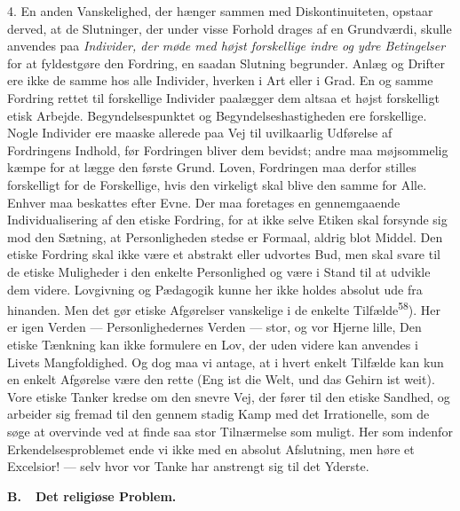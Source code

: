 \documentclass[12pt,a4paper,openany]{book}
\newcommand{\opage}[1]{\marginnote{\footnotesize\textit{[#1]}}}
\begin{document}
4. En anden Vanskelighed, der hænger sammen med Diskontinuiteten, opstaar
derved, at de Slutninger, der under visse Forhold drages af en Grundværdi,
skulle anvendes paa \textit{Individer,
\opage{78}der møde med højst forskellige indre og ydre Betingelser} for at
fyldestgøre den Fordring, en saadan Slutning begrunder. Anlæg og Drifter ere
ikke de samme hos alle Individer, hverken i Art eller i Grad. En og samme
Fordring rettet til forskellige Individer paalægger dem altsaa et højst
forskelligt etisk Arbejde. Begyndelsespunktet og Begyndelseshastigheden ere
forskellige. Nogle Individer ere maaske allerede paa Vej til uvilkaarlig
Udførelse af Fordringens Indhold, før Fordringen bliver dem bevidst; andre maa
møjsommelig kæmpe for at lægge den første Grund. Loven, Fordringen maa derfor
stilles forskelligt for de Forskellige, hvis den virkeligt skal blive den samme
for Alle. Enhver maa beskattes efter Evne. Der maa foretages en gennemgaaende
Individualisering af den etiske Fordring, for at ikke selve Etiken skal
forsynde sig mod den Sætning, at Personligheden stedse er Formaal, aldrig blot
Middel. Den etiske Fordring skal ikke være et abstrakt eller udvortes Bud, men
skal svare til de etiske Muligheder i den enkelte Personlighed og være i Stand
til at udvikle dem videre. Lovgivning og Pædagogik kunne her ikke holdes
absolut ude fra hinanden. Men det gør etiske Afgørelser vanskelige i de enkelte
Tilfælde\textsuperscript{58}). Her er igen Verden --- Personlighedernes Verden
--- stor, og vor Hjerne lille, Den etiske Tænkning kan ikke formulere en Lov,
der uden videre kan anvendes i Livets Mangfoldighed. Og dog maa vi antage, at i
hvert enkelt Tilfælde kan kun en enkelt Afgørelse være den rette (Eng ist die
Welt, und das Gehirn ist weit). Vore etiske Tanker kredse om den snevre Vej,
der fører til den etiske Sandhed, og arbeider sig fremad til den gennem stadig
Kamp med det Irrationelle, som de søge at overvinde ved at finde saa stor
Tilnærmelse som muligt. Her som indenfor Erkendelsesproblemet ende vi ikke med
en absolut Afslutning, men høre et Excelsior! --- selv hvor vor Tanke har
anstrengt sig til det Yderste.

\begin{center}\textbf{\large B.\ \ Det religiøse Problem.}\end{center}
\end{document}
